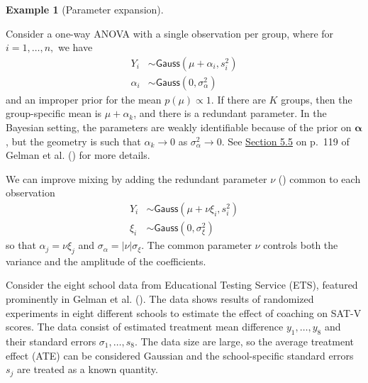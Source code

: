 \documentclass[
  11pt,
  letterpaper,
]{scrbook}
\theoremstyle{definition}
\theoremstyle{plain}
\theoremstyle{plain}
\theoremstyle{plain}
\theoremstyle{definition}
\newtheorem{example}{Example}[chapter]
\theoremstyle{definition}
\theoremstyle{remark}
\begin{document}
\begin{example}[Parameter
expansion]\protect\hypertarget{exm-parameter-expansion}{}\label{exm-parameter-expansion}

Consider a one-way ANOVA with a single observation per group, where for
\(i=1, \ldots, n,\) we have \begin{align*}
Y_{i} &\sim \mathsf{Gauss}(\mu + \alpha_i, s^2_i) \\
\alpha_i &\sim \mathsf{Gauss}(0, \sigma^2_\alpha)
\end{align*} and an improper prior for the mean \(p(\mu) \propto 1.\) If
there are \(K\) groups, then the group-specific mean is
\(\mu+\alpha_k\), and there is a redundant parameter. In the Bayesian
setting, the parameters are weakly identifiable because of the prior on
\(\boldsymbol{\alpha}\), but the geometry is such that
\(\alpha_k \to 0\) as \(\sigma^2_{\alpha} \to 0.\) See
\href{https://users.aalto.fi/~ave/BDA3.pdf}{Section 5.5} on p.~119 of
Gelman et al. () for more details.

We can improve mixing by adding the redundant parameter \(\nu\)
() common to each
observation \begin{align*}
Y_{i} &\sim \mathsf{Gauss}(\mu + \nu\xi_i, s^2_i) \\
\xi_i &\sim \mathsf{Gauss}(0, \sigma^2_\xi)
\end{align*} so that \(\alpha_j = \nu \xi_j\) and
\(\sigma_\alpha = |\nu|\sigma_\xi.\) The common parameter \(\nu\)
controls both the variance and the amplitude of the coefficients.

Consider the eight school data from Educational Testing Service (ETS),
featured prominently in Gelman et al.
(). The data shows results of randomized
experiments in eight different schools to estimate the effect of
coaching on SAT-V scores. The data consist of estimated treatment mean
difference \(y_1, \ldots, y_8\) and their standard errors
\(\sigma_1, \ldots, s_8\). The data size are large, so the average
treatment effect (ATE) can be considered Gaussian and the
school-specific standard errors \(s_j\) are treated as a known quantity.


\end{example}
\end{document}

